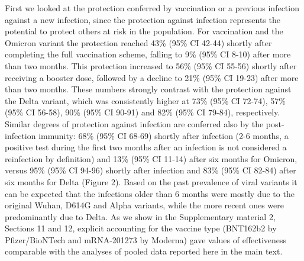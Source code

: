 \documentclass[a4paper,12pt]{article}
\def\figIalone{2}
\begin{document}
First we looked at the protection conferred by vaccination or a previous infection against a new infection, since the protection against infection represents the potential to protect others at risk in the population. For vaccination and the Omicron variant the protection reached 43\% (95\% CI 42-44) shortly after completing the full vaccination scheme, falling to 9\% (95\% CI 8-10) after more than two months. This protection increased to 56\% (95\% CI 55-56) shortly after receiving a booster dose, followed by a decline to 21\% (95\% CI 19-23) after more than two months. These numbers strongly contrast with the protection against the Delta variant, which was consistently higher at 73\% (95\% CI 72-74), 57\% (95\% CI 56-58), 90\% (95\% CI 90-91) and 82\% (95\% CI 79-84), respectively. Similar degrees of protection against infection are conferred also by the post-infection immunity: 68\% (95\% CI 68-69) shortly after infection (2-6 months, a positive test during the first two months after an infection is not considered a reinfection by definition) and 13\% (95\% CI 11-14) after six months for Omicron, versus 95\% (95\% CI 94-96) shortly after infection and 83\% (95\% CI 82-84) after six months for Delta (Figure \figIalone). Based on the past prevalence of viral variants it can be expected that the infections older than 6 months were mostly due to the original Wuhan, D614G and Alpha variants, while the more recent ones were predominantly due to Delta. As we show in the Supplementary material 2, Sections 11 and 12, explicit accounting for the vaccine type (BNT162b2 by Pfizer/BioNTech and mRNA-201273 by Moderna) gave values of effectiveness comparable with the analyses of pooled data reported here in the main text.   
\end{document}

